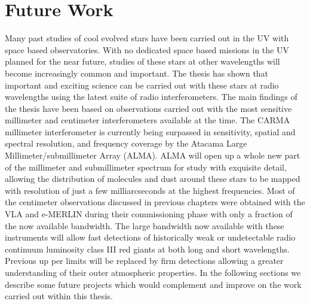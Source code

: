 \section{Future Work}\label{sec:8.2}
Many past studies of cool evolved stars have been carried out in the UV with space based observatories. With no dedicated space based missions in the UV planned for the near future, studies of these stars at other wavelengths will become increasingly common and important. The thesis has shown that important and exciting science can be carried out with these stars at radio wavelengths using the latest suite of radio interferometers. The main findings of the thesis have been based on observations carried out with the most sensitive millimeter and centimeter interferometers available at the time. The CARMA millimeter interferometer is currently being surpassed in sensitivity, spatial and spectral resolution, and frequency coverage by the Atacama Large Millimeter/submillimeter Array (ALMA). ALMA will open up a whole new part of the millimeter and submillimeter spectrum for study with exquisite detail, allowing the distribution of molecules and dust around these stars to be mapped with resolution of just a few milliarcseconds at the highest frequencies. Most of the centimeter observations discussed in previous chapters were obtained with the VLA and e-MERLIN during their commissioning phase with only a fraction of the now available bandwidth. The large bandwidth now available with these instruments will  allow fast detections of historically weak or undetectable radio continuum luminosity class III red giants at both long and short wavelengths. Previous up per limits will be replaced by firm detections allowing a greater understanding of their outer atmospheric properties. In the following sections we describe some future projects which would complement and improve on the work carried out within this thesis.


